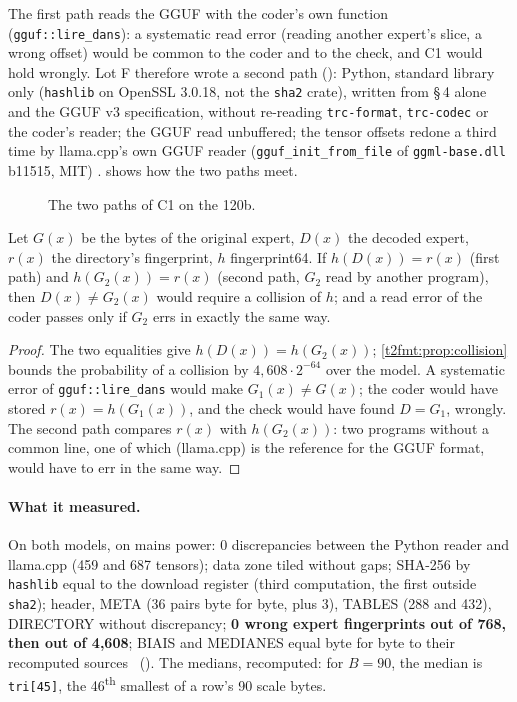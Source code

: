 The first path reads the GGUF with the coder's own function (\texttt{gguf::lire\_dans}): a systematic read error (reading another expert's slice, a wrong offset) would be common to the coder and to the check, and C1 would hold wrongly. Lot F therefore wrote a second path (): Python, standard library only (\texttt{hashlib} on OpenSSL 3.0.18, not the \texttt{sha2} crate), written from §\,4 alone and the GGUF v3 specification, without re-reading \texttt{trc-format}, \texttt{trc-codec} or the coder's reader; the GGUF read unbuffered; the tensor offsets redone a third time by llama.cpp's own GGUF reader (\texttt{gguf\_init\_from\_file} of \texttt{ggml-base.dll} b11515, MIT) \cite{llamacpp_b11515_gguf}.  shows how the two paths meet.

\begin{figure}[ht]
\centering
\TdFmtCun
\caption[The two paths of C1]{The two paths of C1 on the 120b.}
\label{t2fmt:fig:cun}
\end{figure}

\begin{proposition}\label{t2fmt:prop:second-chemin}
Let $G(x)$ be the bytes of the original expert, $D(x)$ the decoded expert, $r(x)$ the directory's fingerprint, $h$ fingerprint64. If $h(D(x)) = r(x)$ (first path) and $h(G_2(x)) = r(x)$ (second path, $G_2$ read by another program), then $D(x) \ne G_2(x)$ would require a collision of $h$; and a read error of the coder passes only if $G_2$ errs in exactly the same way.
\end{proposition}
\begin{proof}
The two equalities give $h(D(x)) = h(G_2(x))$; \cref{t2fmt:prop:collision} bounds the probability of a collision by $4{,}608 \cdot 2^{-64}$ over the model. A systematic error of \texttt{gguf::lire\_dans} would make $G_1(x) \ne G(x)$; the coder would have stored $r(x) = h(G_1(x))$, and the check would have found $D = G_1$, wrongly. The second path compares $r(x)$ with $h(G_2(x))$: two programs without a common line, one of which (llama.cpp) is the reference for the GGUF format, would have to err in the same way.
\end{proof}

\paragraph{What it measured.} On both models, on mains power: 0 discrepancies between the Python reader and llama.cpp (459 and 687 tensors); data zone tiled without gaps; SHA-256 by \texttt{hashlib} equal to the download register (third computation, the first outside \texttt{sha2}); header, META (36 pairs byte for byte, plus 3), TABLES (288 and 432), DIRECTORY without discrepancy; \textbf{0 wrong expert fingerprints out of 768, then out of 4{,}608}; BIAIS and MEDIANES equal byte for byte to their recomputed sources \mes~(). The medians, recomputed: for $B = 90$, the median is \texttt{tri[45]}, the 46\textsuperscript{th} smallest of a row's 90 scale bytes.

